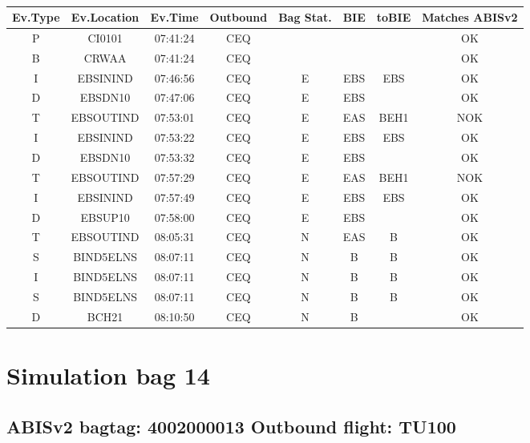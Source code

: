 \documentclass{report}
\begin{document}
\paragraph{}
\begin{longtable}{cccccccc}    \toprule
\rowcolor{white!50}
\textbf{Ev.Type} & \textbf{Ev.Location} & \textbf{Ev.Time} & \textbf{Outbound} & \textbf{Bag Stat.} & \textbf{BIE} & \textbf{toBIE} & \textbf{Matches ABISv2} \\\midrule
P & CI0101 & 07:41:24  & CEQ &  &  &  & OK\\
B & CRWAA & 07:41:24  & CEQ &  &  &  & OK\\
I & EBSININD & 07:46:56  & CEQ & E & EBS & EBS & OK\\
D & EBSDN10 & 07:47:06  & CEQ & E & EBS &  & OK\\
T & EBSOUTIND & 07:53:01  & CEQ & E & EAS & BEH1 & NOK\\
I & EBSININD & 07:53:22  & CEQ & E & EBS & EBS & OK\\
D & EBSDN10 & 07:53:32  & CEQ & E & EBS &  & OK\\
T & EBSOUTIND & 07:57:29  & CEQ & E & EAS & BEH1 & NOK\\
I & EBSININD & 07:57:49  & CEQ & E & EBS & EBS & OK\\
D & EBSUP10 & 07:58:00  & CEQ & E & EBS &  & OK\\
T & EBSOUTIND & 08:05:31  & CEQ & N & EAS & B & OK\\
S & BIND5ELNS & 08:07:11  & CEQ & N & B & B & OK\\
I & BIND5ELNS & 08:07:11  & CEQ & N & B & B & OK\\
S & BIND5ELNS & 08:07:11  & CEQ & N & B & B & OK\\
D & BCH21 & 08:10:50  & CEQ & N & B &  & OK\\
\bottomrule
\end{longtable}
\pagebreak
\section*{Simulation bag 14}
\subsection*{ABISv2 bagtag: 4002000013 Outbound flight: TU100}
\end{document}
